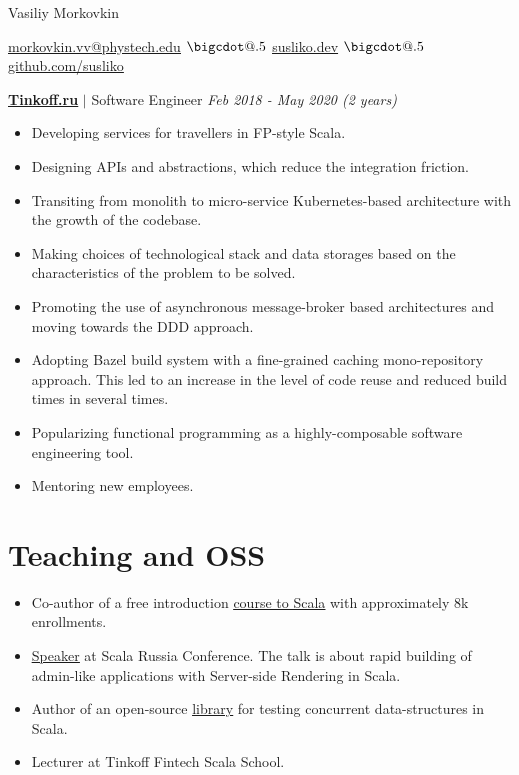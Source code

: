 \documentclass[paper=a4,fontsize=15pt]{scrartcl}
\makeatletter
\newcommand*\bigcdot{\mathpalette\bigcdot@{.5}}
\newcommand*\bigcdot@[2]{\mathbin{\vcenter{\hbox{\scalebox{#2}{$\m@th#1\bullet$}}}}}
\newcommand{\smolboispace}{\vspace*{0.1em}}
\newcommand{\halfspace}{\vspace*{0.5em}}
\newcommand{\bighalfspace}{\vspace*{0.75em}}
\newcommand{\http}[1]{\href{http://#1}{\ul{#1}}}
\newcommand{\https}[1]{\href{https://#1}{\ul{#1}}}
\newcommand{\email}[1]{\href{mailto:#1}{\ul{#1}}}
\makeatother
\begin{document}
\begin{center}
  {\fontsize{35}{40}\selectfont Vasiliy Morkovkin \par}
  \halfspace
  \smolboispace
  \smolboispace

  {\normalsize
    \email{morkovkin.vv@phystech.edu}
    $\bigcdot$ \http{susliko.dev}
    $\bigcdot$ \https{github.com/susliko}
    \par}
\end{center}

\bighalfspace
\normalsize
\noindent \href{https://www.tinkoff.ru}{\textbf{\ul{Tinkoff.ru}}}
$\vert$ \small Software Engineer
{\hfill \footnotesize \textit{Feb 2018 - May 2020 (2 years)}}
\begin{itemize}[noitemsep,leftmargin=20pt,label=\raisebox{0.25ex}{\tiny$\bullet$},topsep=5pt]
  \small
  \item Developing services for travellers in FP-style Scala.
  \item Designing APIs and abstractions, which reduce the integration friction.
  \item Transiting from monolith to micro-service Kubernetes-based architecture with the growth of the codebase.
  \item Making choices of technological stack and data storages based on the characteristics of the problem to be solved. 
  \item Promoting the use of asynchronous message-broker based architectures and moving towards the DDD approach.
  \item Adopting Bazel build system with a fine-grained caching mono-repository approach. This led to an increase in the level of code reuse and reduced build times in several times.
  \item Popularizing functional programming as a highly-composable software engineering tool.
  \item Mentoring new employees.
\end{itemize}

\section*{Teaching and OSS}{}
\begin{itemize}[noitemsep,leftmargin=20pt,label=\raisebox{0.25ex}{\tiny$\bullet$},topsep=5pt]
  \item Co-author of a free introduction \href{https://stepik.org/course/16243}{\ul{course to Scala}} with approximately 8k enrollments.
  \item \href{https://www.youtube.com/watch?v=8KxWi0xuDKs&t=15s}{\ul{Speaker}} at Scala Russia Conference. The talk is about rapid building of admin-like applications with Server-side Rendering in Scala.
  \item Author of an open-source \href{https://github.com/susliko/lotos}{\ul{library}} for testing concurrent data-structures in Scala.
  \item Lecturer at Tinkoff Fintech Scala School.
\end{itemize}
\end{document}

